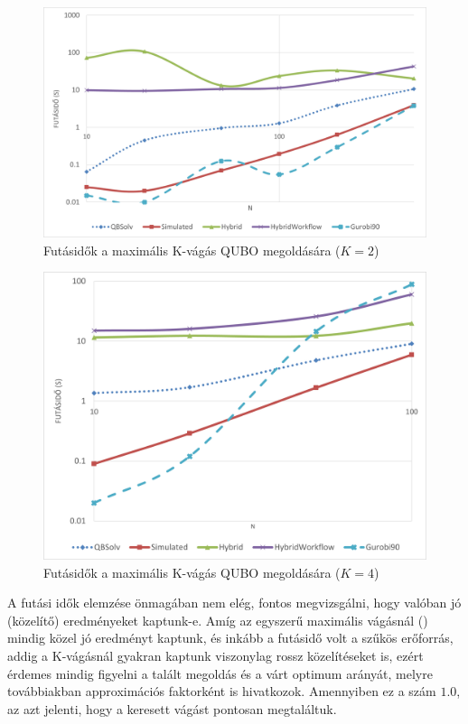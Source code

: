 \begin{figure}[!ht]
	\centering
	\includegraphics[width=150mm, keepaspectratio]{figures/diagrams/maxKCutQUBO_K2.png}
	\caption{Futásidők a maximális K-vágás QUBO megoldására ($K=2$)}
	\label{fig:maxKCutQUBO_K2}
\end{figure}

\begin{figure}[!ht]
	\centering
	\includegraphics[width=150mm, keepaspectratio]{figures/diagrams/maxKCutQUBO_K4.png}
	\caption{Futásidők a maximális K-vágás QUBO megoldására ($K=4$)}
	\label{fig:maxKCutQUBO_K4}
\end{figure}

A futási idők elemzése önmagában nem elég, fontos megvizsgálni, hogy valóban jó (közelítő) eredményeket kaptunk-e. Amíg az egyszerű maximális vágásnál () mindig közel jó eredményt kaptunk, és inkább a futásidő volt a szűkös erőforrás, addig a K-vágásnál gyakran kaptunk viszonylag rossz közelítéseket is, ezért érdemes mindig figyelni a talált megoldás és a várt optimum arányát, melyre továbbiakban approximációs faktorként is hivatkozok. Amennyiben ez a szám $1.0$, az azt jelenti, hogy a keresett vágást pontosan megtaláltuk.

